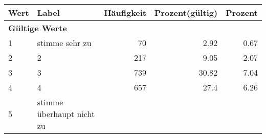      \begin{longtable}{lXrrr}
     \toprule
     \textbf{Wert} & \textbf{Label} & \textbf{Häufigkeit} & \textbf{Prozent(gültig)} & \textbf{Prozent} \\
     \endhead
     \midrule
     \multicolumn{5}{l}{\textbf{Gültige Werte}}\\

     1 &
     \multicolumn{1}{X}{ stimme sehr zu   } &


       \num{70} &
       \num[round-mode=places,round-precision=2]{2,92} &
         \num[round-mode=places,round-precision=2]{0,67} \\

     2 &
     \multicolumn{1}{X}{ 2   } &


       \num{217} &
       \num[round-mode=places,round-precision=2]{9,05} &
         \num[round-mode=places,round-precision=2]{2,07} \\

     3 &
     \multicolumn{1}{X}{ 3   } &


       \num{739} &
       \num[round-mode=places,round-precision=2]{30,82} &
         \num[round-mode=places,round-precision=2]{7,04} \\

     4 &
     \multicolumn{1}{X}{ 4   } &


       \num{657} &
       \num[round-mode=places,round-precision=2]{27,4} &
         \num[round-mode=places,round-precision=2]{6,26} \\

     5 &
     \multicolumn{1}{X}{ stimme überhaupt nicht zu   } &



\end{longtable}
